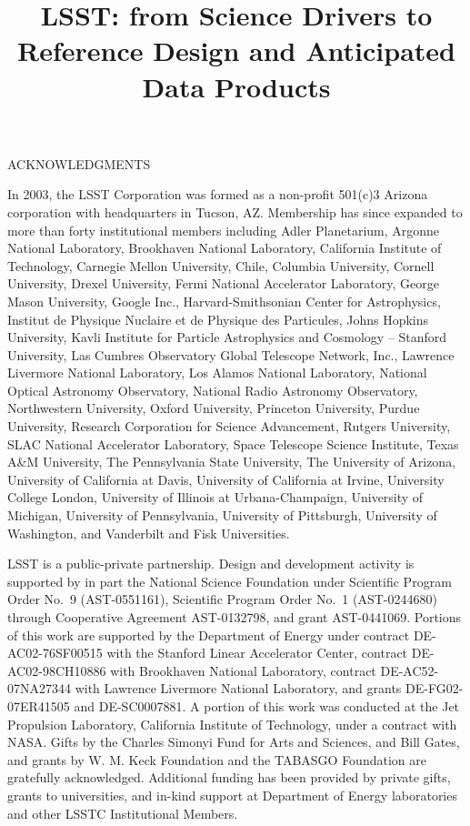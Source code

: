 \documentclass{emulateapj}
\begin{document}
\title{LSST: from Science Drivers to Reference Design and Anticipated Data Products}













\vskip 0.15in
\centerline{ACKNOWLEDGMENTS}

In 2003, the LSST Corporation was formed as a non-profit 501(c)3 Arizona corporation
with headquarters in Tucson, AZ.  Membership has since expanded to
more than forty institutional members
including Adler Planetarium, Argonne National Laboratory, Brookhaven National Laboratory, California Institute of Technology,
Carnegie Mellon University, Chile,  Columbia University, Cornell University, Drexel University,
Fermi National Accelerator Laboratory, George Mason University, Google Inc., Harvard-Smithsonian
Center for Astrophysics, Institut de Physique Nuclaire et de Physique des Particules, Johns Hopkins
University, Kavli Institute for Particle Astrophysics and Cosmology -- Stanford University, Las
Cumbres Observatory Global Telescope Network, Inc., Lawrence Livermore National Laboratory,
Los Alamos National Laboratory,  National Optical Astronomy
Observatory, National Radio Astronomy Observatory, Northwestern
University, Oxford University,
Princeton University, Purdue University, Research Corporation for Science Advancement, Rutgers
University, SLAC National Accelerator Laboratory, Space Telescope Science Institute,
Texas A\&M University, The Pennsylvania State University, The University of Arizona, University
of California at Davis, University of California at Irvine, University College London, University of
Illinois at Urbana-Champaign, University of Michigan, University of Pennsylvania, University of
Pittsburgh, University of Washington, and Vanderbilt and Fisk Universities.

LSST is a public-private partnership.  Design and development activity is
supported by in part the National Science Foundation under Scientific
Program Order No.~9 (AST-0551161), Scientific Program Order No.~1
(AST-0244680) through Cooperative Agreement AST-0132798, and grant AST-0441069.
Portions of this work are supported by the Department of Energy under contract
DE-AC02-76SF00515 with the Stanford Linear Accelerator Center, contract
DE-AC02-98CH10886 with Brookhaven National Laboratory, contract
DE-AC52-07NA27344 with Lawrence Livermore National Laboratory, and grants
DE-FG02-07ER41505 and DE-SC0007881. A portion of this work was conducted at the Jet Propulsion
Laboratory, California Institute of Technology, under a contract with NASA.
Gifts by the Charles Simonyi Fund for Arts and Sciences,
and Bill Gates, and grants by W. M. Keck Foundation and the TABASGO Foundation
are gratefully acknowledged. Additional funding has been provided by private gifts, grants
to universities, and in-kind support at Department of Energy laboratories and other
LSSTC Institutional Members.
\end{document}
